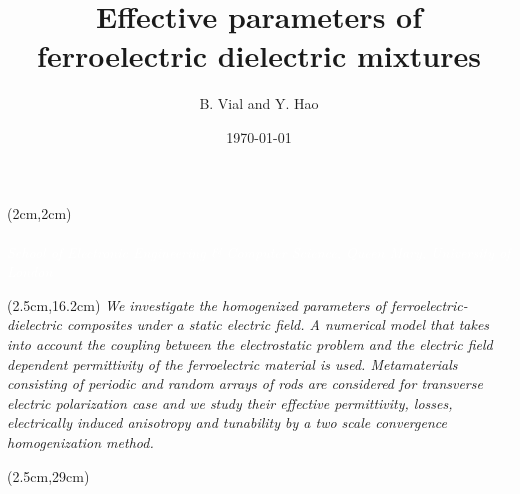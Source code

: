 \documentclass[final,12pt]{beamer} %
\begin{document}
\color{fresnelblack}
\date{\today}
\title{Effective parameters of ferroelectric dielectric mixtures}
\subtitle{}
\author{B. Vial and Y. Hao }

\begin{frame}


\begin{textblock*}{80cm}(2cm,2cm)
{\hfill \blackfont\fontsize{1.9cm}{1em}\selectfont \textcolor{fresnelorange}{\MakeUppercase{\inserttitle}}\\}\vspace*{2em}
{\hfill \textcolor{white}{\Large\insertauthor}\\}
\vspace*{16pt}
{\hfill \itshape\large\textcolor{white}{
School of Electronic Engineering \& Computer Science, Queen Mary, University of London}}
\end{textblock*}




\begin{textblock*}{79.5cm}(2.5cm,16.2cm)
{ \vspace{0.5em} 
  \large \itshape
  We investigate the homogenized parameters of ferroelectric-dielectric composites under a static electric field. A numerical model that takes into account the coupling
  between the electrostatic problem and the electric field dependent permittivity of the
  ferroelectric material is used. Metamaterials consisting of periodic and random arrays of rods
  are considered for transverse electric polarization case
  and we study their effective permittivity, losses, electrically induced anisotropy
  and tunability by a two scale convergence homogenization method.}
\end{textblock*}


% 
% 
\begin{textblock*}{38.5cm}(2.5cm,29cm)


\end{textblock*}
\end{frame}
\end{document}
